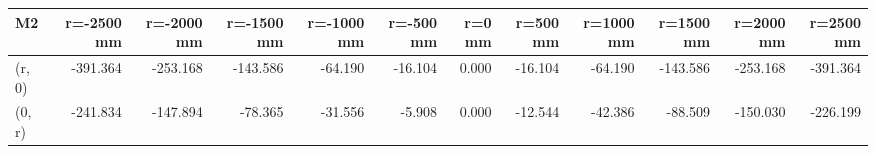 \documentclass[convert={convertexe={magick.exe}}]{standalone}
\begin{document}
\begin{tabular}{lrrrrrrrrrrr}
\toprule
\bf{M2} &  r=-2500 mm &  r=-2000 mm &  r=-1500 mm &  r=-1000 mm &  r=-500 mm &  r=0 mm &  r=500 mm &  r=1000 mm &  r=1500 mm &  r=2000 mm &  r=2500 mm \\
\midrule
(r, 0) &    -391.364 &    -253.168 &    -143.586 &     -64.190 &    -16.104 &   0.000 &   -16.104 &    -64.190 &   -143.586 &   -253.168 &   -391.364 \\
(0, r) &    -241.834 &    -147.894 &     -78.365 &     -31.556 &     -5.908 &   0.000 &   -12.544 &    -42.386 &    -88.509 &   -150.030 &   -226.199 \\
\bottomrule
\end{tabular}
\end{document}
